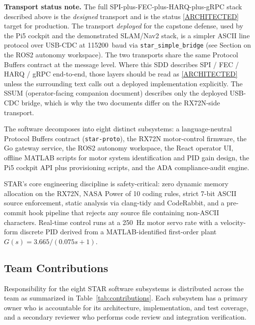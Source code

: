 \documentclass[11pt,letterpaper]{article}
\newcommand{\statuslabel}[1]{\hyperref[sec:status-legend]{[#1]}}
\begin{document}
\textbf{Transport status note.} The full SPI-plus-FEC-plus-HARQ-plus-gRPC
stack described above is the \emph{designed} transport and is the
status \statuslabel{ARCHITECTED} target for production. The transport
\emph{deployed} for the capstone defense, used by the Pi5 cockpit and
the demonstrated SLAM/Nav2 stack, is a simpler ASCII line protocol
over USB-CDC at 115200~baud via \texttt{star\_simple\_bridge}
(see Section on the ROS2 autonomy workspace). The two transports
share the same Protocol Buffers contract at the message level. Where
this SDD describes SPI / FEC / HARQ / gRPC end-to-end, those layers
should be read as \statuslabel{ARCHITECTED} unless the surrounding text
calls out a deployed implementation explicitly. The SSUM
(operator-facing companion document) describes only the deployed
USB-CDC bridge, which is why the two documents differ on the
RX72N-side transport.

The software decomposes into eight distinct subsystems: a
language-neutral Protocol Buffers contract (\texttt{star-proto}), the
RX72N motor-control firmware, the Go gateway service, the ROS2 autonomy
workspace, the React operator UI, offline MATLAB scripts for motor
system identification and PID gain design, the Pi5 cockpit API plus
provisioning scripts, and the ADA compliance-audit engine.

STAR's core engineering discipline is safety-critical: zero dynamic
memory allocation on the RX72N, NASA Power of 10 coding rules, strict
7-bit ASCII source enforcement, static analysis via clang-tidy and
CodeRabbit, and a pre-commit hook pipeline that rejects any source file
containing non-ASCII characters. Real-time control runs at a
\qty{250}{\hertz} motor servo rate with a velocity-form discrete PID
derived from a MATLAB-identified first-order plant
$G(s) = 3.665/(0.075s+1)$.

\subsection{Team Contributions}
\label{sec:team-contributions}

Responsibility for the eight STAR software subsystems is distributed
across the team as summarized in Table~\ref{tab:contributions}. Each
subsystem has a primary owner who is accountable for its architecture,
implementation, and test coverage, and a secondary reviewer who
performs code review and integration verification.
\end{document}
